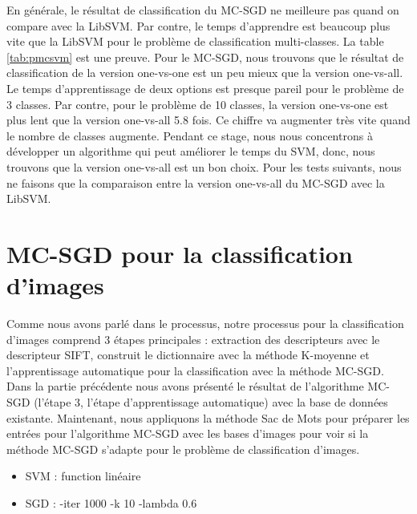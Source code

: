 En générale, le résultat de classification du MC-SGD ne meilleure pas quand on compare avec la LibSVM. Par contre, le temps d'apprendre est beaucoup plus vite que la LibSVM pour le problème de classification multi-classes. La table \ref{tab:pmcsvm} est une preuve.
Pour le MC-SGD, nous trouvons que le résultat de classification de la version one-vs-one est un peu mieux que la version one-vs-all. Le temps  d'apprentissage de deux options est presque pareil pour le problème de 3 classes. Par contre, pour le problème de 10 classes, la version one-vs-one est plus lent que la version one-vs-all 5.8 fois. Ce chiffre va augmenter très vite quand le nombre de classes augmente. Pendant ce stage, nous nous concentrons à développer un algorithme qui peut améliorer le temps du SVM, donc, nous trouvons que la version one-vs-all est un bon choix. Pour les tests suivants, nous ne faisons que la comparaison entre la version one-vs-all du MC-SGD avec la LibSVM.

\section{MC-SGD pour la classification d'images}
Comme nous avons parlé dans le processus, notre processus pour la classification d'images comprend 3 étapes principales : extraction des descripteurs avec le descripteur SIFT, construit le dictionnaire avec la méthode K-moyenne et l'apprentissage automatique pour la classification avec la méthode MC-SGD. Dans la partie précédente nous avons présenté le résultat de l'algorithme MC-SGD (l'étape 3, l'étape d'apprentissage automatique) avec la base de données existante. Maintenant, nous appliquons la méthode Sac de Mots pour préparer les entrées pour l'algorithme MC-SGD avec les bases d'images pour voir si la méthode MC-SGD s'adapte pour le problème de classification d'images.
\begin{itemize}
\item SVM : function linéaire
\item SGD : -iter 1000 -k 10 -lambda 0.6
\end{itemize}

